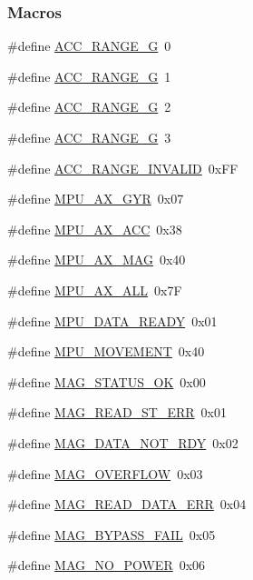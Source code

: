 \subsubsection*{Macros}
\begin{DoxyCompactItemize}
\item 
\#define \hyperlink{_sensor_mpu9250_8h_abc4ef02068eeab8d7749cdd74f51ad6e}{A\+C\+C\+\_\+\+R\+A\+N\+G\+E\+\_\+G}~0
\item 
\#define \hyperlink{_sensor_mpu9250_8h_a1c2254abc35ba34e1f8ddd6d135626c9}{A\+C\+C\+\_\+\+R\+A\+N\+G\+E\+\_\+G}~1
\item 
\#define \hyperlink{_sensor_mpu9250_8h_a6ace6622fb4717d882aa4bce9995e5d4}{A\+C\+C\+\_\+\+R\+A\+N\+G\+E\+\_\+G}~2
\item 
\#define \hyperlink{_sensor_mpu9250_8h_a0963334f69738c406dc0b1317e704059}{A\+C\+C\+\_\+\+R\+A\+N\+G\+E\+\_\+G}~3
\item 
\#define \hyperlink{_sensor_mpu9250_8h_ab1589368771e7a1cc4bdd0c1b1082ce8}{A\+C\+C\+\_\+\+R\+A\+N\+G\+E\+\_\+\+I\+N\+V\+A\+L\+I\+D}~0x\+F\+F
\item 
\#define \hyperlink{_sensor_mpu9250_8h_a12f74f3b6b2ba2113d7e4e4370e0a8e4}{M\+P\+U\+\_\+\+A\+X\+\_\+\+G\+Y\+R}~0x07
\item 
\#define \hyperlink{_sensor_mpu9250_8h_a0b48ac6995dff8817d287abf12af7728}{M\+P\+U\+\_\+\+A\+X\+\_\+\+A\+C\+C}~0x38
\item 
\#define \hyperlink{_sensor_mpu9250_8h_a6d69e3ef527fb739f6c6f6d221326762}{M\+P\+U\+\_\+\+A\+X\+\_\+\+M\+A\+G}~0x40
\item 
\#define \hyperlink{_sensor_mpu9250_8h_a2715503b0c3c16e31ad7496d1c39cba9}{M\+P\+U\+\_\+\+A\+X\+\_\+\+A\+L\+L}~0x7\+F
\item 
\#define \hyperlink{_sensor_mpu9250_8h_a9089d4df07cdfd3eb0d831d6e0a46ea9}{M\+P\+U\+\_\+\+D\+A\+T\+A\+\_\+\+R\+E\+A\+D\+Y}~0x01
\item 
\#define \hyperlink{_sensor_mpu9250_8h_ae8b13fe9114199150efae2942dd065df}{M\+P\+U\+\_\+\+M\+O\+V\+E\+M\+E\+N\+T}~0x40
\item 
\#define \hyperlink{_sensor_mpu9250_8h_a561317e29a01be9d04f17a84aef1c46a}{M\+A\+G\+\_\+\+S\+T\+A\+T\+U\+S\+\_\+\+O\+K}~0x00
\item 
\#define \hyperlink{_sensor_mpu9250_8h_acebcf6323a6758500592adfd47d27f4c}{M\+A\+G\+\_\+\+R\+E\+A\+D\+\_\+\+S\+T\+\_\+\+E\+R\+R}~0x01
\item 
\#define \hyperlink{_sensor_mpu9250_8h_ad23103397377f77033ef1407d7ce948c}{M\+A\+G\+\_\+\+D\+A\+T\+A\+\_\+\+N\+O\+T\+\_\+\+R\+D\+Y}~0x02
\item 
\#define \hyperlink{_sensor_mpu9250_8h_afa761a3aae81d8f551bf0afa37f5f0e6}{M\+A\+G\+\_\+\+O\+V\+E\+R\+F\+L\+O\+W}~0x03
\item 
\#define \hyperlink{_sensor_mpu9250_8h_ac5eb51e2b0a75689bf0751d8cb1e2d13}{M\+A\+G\+\_\+\+R\+E\+A\+D\+\_\+\+D\+A\+T\+A\+\_\+\+E\+R\+R}~0x04
\item 
\#define \hyperlink{_sensor_mpu9250_8h_afef90734eba934f4aa4bdb196e90d7c3}{M\+A\+G\+\_\+\+B\+Y\+P\+A\+S\+S\+\_\+\+F\+A\+I\+L}~0x05
\item 
\#define \hyperlink{_sensor_mpu9250_8h_a22fdc0872449f36a67d8dd323037ee43}{M\+A\+G\+\_\+\+N\+O\+\_\+\+P\+O\+W\+E\+R}~0x06
\end{DoxyCompactItemize}
